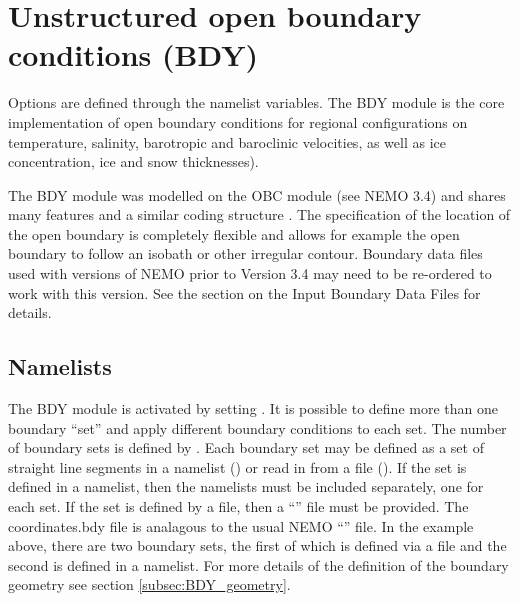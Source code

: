 \documentclass[../main/NEMO_manual]{subfiles}
\begin{document}
\section{Unstructured open boundary conditions (BDY)}
\label{sec:LBC_bdy}




Options are defined through the   namelist variables.
The BDY module is the core implementation of open boundary conditions for regional configurations on 
temperature, salinity, barotropic and baroclinic velocities, as well as ice concentration, ice and snow thicknesses).

The BDY module was modelled on the OBC module (see NEMO 3.4) and shares many features and
a similar coding structure \citep{Chanut2005}.
The specification of the location of the open boundary is completely flexible and
allows for example the open boundary to follow an isobath or other irregular contour. 
Boundary data files used with versions of NEMO prior to Version 3.4 may need to be re-ordered to work with this version.
See the section on the Input Boundary Data Files for details.

\subsection{Namelists}
\label{subsec:BDY_namelist}

The BDY module is activated by setting  .
It is possible to define more than one boundary ``set'' and apply different boundary conditions to each set.
The number of boundary sets is defined by .
Each boundary set may be defined as a set of straight line segments in a namelist
() or read in from a file ().
If the set is defined in a namelist, then the namelists  must be included separately, one for each set.
If the set is defined by a file, then a ``'' file must be provided.
The coordinates.bdy file is analagous to the usual NEMO ``'' file.
In the example above, there are two boundary sets, the first of which is defined via a file and
the second is defined in a namelist.
For more details of the definition of the boundary geometry see section \autoref{subsec:BDY_geometry}.
\end{document}
